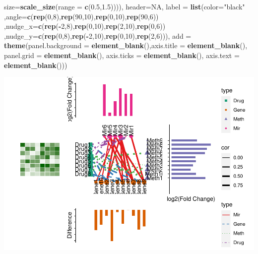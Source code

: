 \documentclass[
]{article}
\newenvironment{Shaded}{\begin{snugshade}}{\end{snugshade}}
\newcommand{\DataTypeTok}[1]{\textcolor[rgb]{0.13,0.29,0.53}{#1}}
\newcommand{\DecValTok}[1]{\textcolor[rgb]{0.00,0.00,0.81}{#1}}
\newcommand{\FloatTok}[1]{\textcolor[rgb]{0.00,0.00,0.81}{#1}}
\newcommand{\KeywordTok}[1]{\textcolor[rgb]{0.13,0.29,0.53}{\textbf{#1}}}
\newcommand{\NormalTok}[1]{#1}
\newcommand{\OperatorTok}[1]{\textcolor[rgb]{0.81,0.36,0.00}{\textbf{#1}}}
\newcommand{\OtherTok}[1]{\textcolor[rgb]{0.56,0.35,0.01}{#1}}
\newcommand{\StringTok}[1]{\textcolor[rgb]{0.31,0.60,0.02}{#1}}
\begin{document}
\begin{Shaded}
\begin{Highlighting}[]
                                \DataTypeTok{size=}\KeywordTok{scale_size}\NormalTok{(}\DataTypeTok{range =} \KeywordTok{c}\NormalTok{(}\FloatTok{0.5}\NormalTok{,}\FloatTok{1.5}\NormalTok{)))),}
       \DataTypeTok{header=}\OtherTok{NA}\NormalTok{,}
       \DataTypeTok{label =} \KeywordTok{list}\NormalTok{(}\DataTypeTok{color=}\StringTok{"black"}
\NormalTok{                    ,}\DataTypeTok{angle=}\KeywordTok{c}\NormalTok{(}\KeywordTok{rep}\NormalTok{(}\DecValTok{0}\NormalTok{,}\DecValTok{8}\NormalTok{),}\KeywordTok{rep}\NormalTok{(}\DecValTok{90}\NormalTok{,}\DecValTok{10}\NormalTok{),}\KeywordTok{rep}\NormalTok{(}\DecValTok{0}\NormalTok{,}\DecValTok{10}\NormalTok{),}\KeywordTok{rep}\NormalTok{(}\DecValTok{90}\NormalTok{,}\DecValTok{6}\NormalTok{))}
\NormalTok{                    ,}\DataTypeTok{nudge_x=}\KeywordTok{c}\NormalTok{(}\KeywordTok{rep}\NormalTok{(}\OperatorTok{-}\DecValTok{2}\NormalTok{,}\DecValTok{8}\NormalTok{),}\KeywordTok{rep}\NormalTok{(}\DecValTok{0}\NormalTok{,}\DecValTok{10}\NormalTok{),}\KeywordTok{rep}\NormalTok{(}\DecValTok{2}\NormalTok{,}\DecValTok{10}\NormalTok{),}\KeywordTok{rep}\NormalTok{(}\DecValTok{0}\NormalTok{,}\DecValTok{6}\NormalTok{))}
\NormalTok{                    ,}\DataTypeTok{nudge_y=}\KeywordTok{c}\NormalTok{(}\KeywordTok{rep}\NormalTok{(}\DecValTok{0}\NormalTok{,}\DecValTok{8}\NormalTok{),}\KeywordTok{rep}\NormalTok{(}\OperatorTok{-}\DecValTok{2}\NormalTok{,}\DecValTok{10}\NormalTok{),}\KeywordTok{rep}\NormalTok{(}\DecValTok{0}\NormalTok{,}\DecValTok{10}\NormalTok{),}\KeywordTok{rep}\NormalTok{(}\DecValTok{2}\NormalTok{,}\DecValTok{6}\NormalTok{))),}
       \DataTypeTok{add   =}  \KeywordTok{theme}\NormalTok{(}\DataTypeTok{panel.background =} \KeywordTok{element_blank}\NormalTok{(),}\DataTypeTok{axis.title =} \KeywordTok{element_blank}\NormalTok{(),}
                      \DataTypeTok{panel.grid =} \KeywordTok{element_blank}\NormalTok{(),}
                      \DataTypeTok{axis.ticks =} \KeywordTok{element_blank}\NormalTok{(),}
                      \DataTypeTok{axis.text =} \KeywordTok{element_blank}\NormalTok{()))}
\end{Highlighting}
\end{Shaded}

\includegraphics{ReadMe1_files/figure-latex/unnamed-chunk-17-6.pdf}
\end{document}
